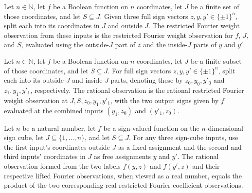 \begin{definition}
\label{FABL.restrictedFourierWeightObservationFromInputs}
\leanok
{}
Let $n\in\mathbb N$, let $f$ be a Boolean function on $n$ coordinates, let $J$ be a
finite set of those coordinates, and let $S\subseteq J$. Given three full sign vectors
$z,y,y'\in\{\pm1\}^n$, split each into its coordinates in $J$ and outside $J$. The
restricted Fourier weight observation from these inputs is the restricted Fourier weight
observation for $f$, $J$, and $S$, evaluated using the outside-$J$ part of $z$ and the
inside-$J$ parts of $y$ and $y'$.
\end{definition}

\begin{definition}
\label{FABL.rationalRestrictedFourierWeightObservationFromInputs}
\leanok
{}
Let $n\in\mathbb N$, let $f$ be a Boolean function on $n$ coordinates, let $J$ be a
finite subset of those coordinates, and let $S\subseteq J$. For full sign vectors
$z,y,y'\in\{\pm1\}^n$, split each into its outside-$J$ and inside-$J$ parts, denoting
these by $z_0,y_0,y'_0$ and $z_1,y_1,y'_1$, respectively. The rational observation is
the rational restricted Fourier weight observation at $J,S,z_0,y_1,y'_1$, with the two
output signs given by $f$ evaluated at the combined inputs $(y_1,z_0)$ and $(y'_1,z_0)$.
\end{definition}

\begin{theorem}
\label{FABL.rationalRestrictedFourierWeightObservationFromInputs_cast}
\leanok
{}
Let $n$ be a natural number, let $f$ be a sign-valued function on the $n$-dimensional
sign cube, let $J\subseteq\{1,\ldots,n\}$, and let $S\subseteq J$. For any three
sign-cube inputs, use the first input's coordinates outside $J$ as a fixed assignment
and the second and third inputs' coordinates in $J$ as free assignments $y$ and $y'$.
The rational observation formed from the two labels $f(y,z)$ and $f(y',z)$ and their
respective lifted Fourier observations, when viewed as a real number, equals the product
of the two corresponding real restricted Fourier coefficient observations.
\end{theorem}

